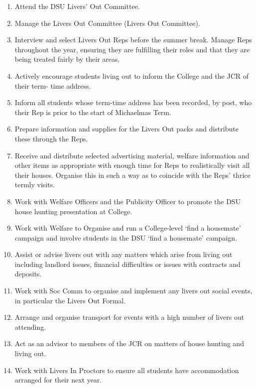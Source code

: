 \begin{enumerate}
    \item Attend the DSU Livers’ Out Committee.
    \item Manage the Livers Out Committee (Livers Out Committee).
    \item Interview and select Livers Out Reps before the summer break. Manage Reps throughout the year, ensuring they are fulfilling their roles and that they are being treated fairly by their areas.
    \item Actively encourage students living out to inform the College and the JCR of their term- time address.
    \item Inform all students whose term-time address has been recorded, by post, who their Rep is prior to the start of Michaelmas Term.
    \item Prepare information and supplies for the Livers Out packs and distribute these through the Reps.
    \item Receive and distribute selected advertising material, welfare information and other items as appropriate with enough time for Reps to realistically visit all their houses. Organise this in such a way as to coincide with the Reps' thrice termly visits.
    \item Work with Welfare Officers and the Publicity Officer to promote the DSU house hunting presentation at College.
    \item Work with Welfare to Organise and run a College-level ‘find a housemate’ campaign and involve students in the DSU ‘find a housemate’ campaign.
    \item Assist or advise livers out with any matters which arise from living out including landlord issues, financial difficulties or issues with contracts and deposits.
    \item Work with Soc Comm to organise and implement any livers out social events, in particular the Livers Out Formal.
    \item Arrange and organise transport for events with a high number of livers out attending.
    \item Act as an advisor to members of the JCR on matters of house hunting and living out.
    \item Work with Livers In Proctors to ensure all students have accommodation arranged for their next year.
    
\end{enumerate}

